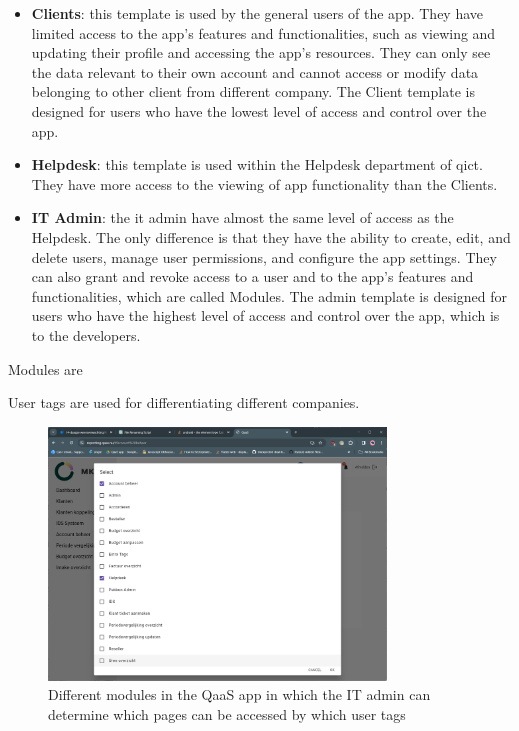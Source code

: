 \begin{multicols}{2}
      \begin{itemize}
            \item \textbf{Clients}: this template is used by the general users of the app. They have limited access to
                  the app's features and functionalities, such as viewing and updating their profile and accessing the app's
                  resources. They can only see the data relevant to their own account and cannot access or modify data
                  belonging to other client from different company.  The Client template is designed for users who have the
                  lowest level of access and control over the app.
            \item \textbf{Helpdesk}: this template is used within the Helpdesk department of \acrshort{qict}. They have more
                  access to the viewing of app functionality than the Clients.
            \item \textbf{IT Admin}: the \acrshort{it} admin have almost the same level of access as the Helpdesk. The only
                  difference is that they have the ability to create, edit, and delete users, manage user permissions, and
                  configure the app settings. They can also grant and revoke access to a user and to the app's features and
                  functionalities, which are called Modules. The admin template is designed for users who have the highest level
                  of access and control over the app, which is to the developers.
      \end{itemize}

      Modules are

      User tags are used for differentiating different companies.
\end{multicols}

\begin{figure}[htbp]
      \centering
      \includegraphics[width=0.8\textwidth]{Figures/Qaas App/Modules/afbeelding (1).png}
      \caption{Different modules in the QaaS app in which the IT admin can determine which pages can be accessed by which user tags}
      \label{fig:qaasAppModules}
\end{figure}

